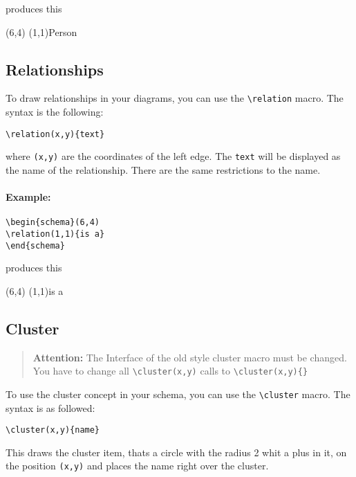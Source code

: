 \documentclass[a4paper,11pt]{article}
\begin{document}
produces this

\begin{schema}(6,4)
\entity(1,1){Person}
\end{schema}

\subsection{Relationships}

To draw relationships in your diagrams, you can use the \verb|\relation| macro.
The syntax is the following:

\begin{verbatim}
\relation(x,y){text}
\end{verbatim}

where {\tt (x,y)} are the coordinates of the left edge. The {\tt text} will be displayed as 
the name of the relationship. There are the same restrictions to the name.

\paragraph{Example:}

\begin{verbatim}
\begin{schema}(6,4)
\relation(1,1){is a}
\end{schema}
\end{verbatim}

produces this

\begin{schema}(6,4)
\relation(1,1){is a}
\end{schema}

\subsection{Cluster}

\begin{quote}
  {\bf Attention:} The Interface of the old style cluster macro must be changed. You have
  to change all \verb|\cluster(x,y)| calls to \verb|\cluster(x,y){}|
\end{quote}

To use the cluster concept in your schema, you can use the \verb|\cluster| macro.
The syntax is as followed:

\begin{verbatim}
\cluster(x,y){name}
\end{verbatim}

This draws the cluster item, thats a circle with the radius 2 whit a plus in it, on the position 
{\tt (x,y)} and places the name right over the cluster.
\end{document}
